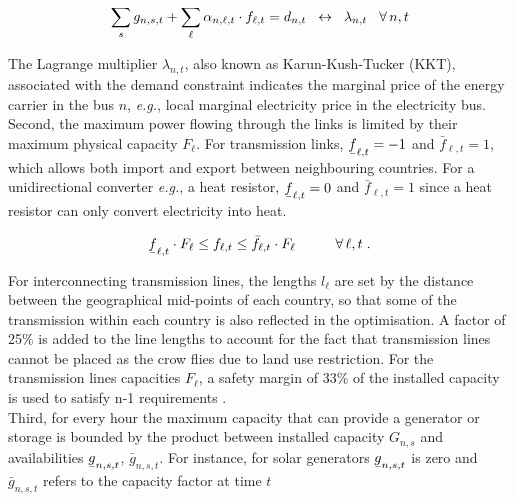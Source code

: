 \documentclass[3p]{elsarticle} %
\newcommand{\ubar}[1]{\text{\b{$#1$}}}
\begin{document}
\begin{equation}
\sum_{s} g_{n,s,t}+ \sum_{\ell} \alpha_{n,\ell,t}\cdot f_{\ell,t} = d_{n,t} \hspace{.2cm} \leftrightarrow \hspace{0.2cm} \lambda_{n,t} \hspace{.3cm} \forall\, n,t \label{eq_energy_balance}
\end{equation}

The Lagrange multiplier $\lambda_{n,t}$,  also known as Karun-Kush-Tucker (KKT),  associated with the demand constraint indicates the marginal price of the energy carrier in the bus $n$, \textit{e.g.}, local marginal electricity price in the electricity bus. \\

Second, the maximum power flowing through the links is limited by their maximum physical capacity $F_{\ell}$. For transmission links, $\ubar{f}_{\ell,t}=-1$ and $\bar{f}_{\ell,t}=1$, which allows both import and export between neighbouring countries. For a unidirectional converter \textit{e.g.}, a heat resistor, $\ubar{f}_{\ell,t}=0$ and $\bar{f}_{\ell,t}=1$ since a heat resistor can only convert electricity into heat.

\begin{equation}
\ubar{f}_{\ell,t} \cdot F_{\ell} \leq f_{\ell,t} \leq \bar{f}_{\ell,t} \cdot F_{\ell} \hspace{1cm} \forall\, \ell,t \; . \label{eq_links}
\end{equation}

For interconnecting transmission lines, the lengths $l_{\ell}$ are set by the distance between the geographical mid-points of each country, so that some of the transmission within each country is also reflected in the optimisation. A factor of 25\% is added to the line lengths to account for the fact that transmission lines cannot be placed as the crow flies due to land use restriction. For the transmission lines capacities $F_{\ell}$, a safety margin of 33\% of the installed capacity is used to satisfy n-1 requirements \cite{Brown_2016}. \\ %

Third, for every hour the maximum capacity that can provide a generator or storage is bounded by the product between installed capacity $G_{n,s}$ and availabilities $\ubar{g}_{n,s,t}$, $\bar{g}_{n,s,t}$. For instance, for solar generators $\ubar{g}_{n,s,t}$ is zero and $\bar{g}_{n,s,t}$ refers to the capacity factor at time $t$ 
\end{document}
